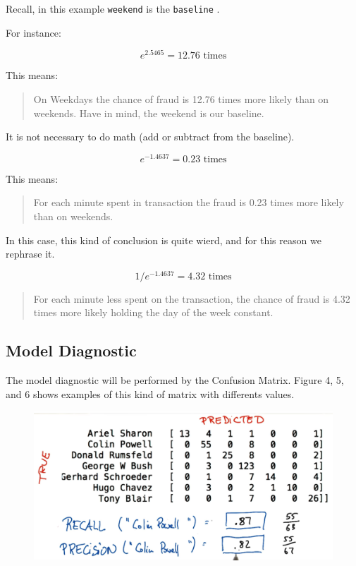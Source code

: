 \documentclass[]{book}
\begin{document}
Recall, in this example \texttt{weekend} is the \texttt{baseline} .

For instance:

\[e^{2.5465} = 12.76 \text{ times} \]

This means:

\begin{quote}
On Weekdays the chance of fraud is 12.76 times more likely than on
weekends. Have in mind, the weekend is our baseline.
\end{quote}

It is not necessary to do math (add or subtract from the baseline).

\[e^{-1.4637} = 0.23 \text{ times} \]

This means:

\begin{quote}
For each minute spent in transaction the fraud is 0.23 times more likely
than on weekends.
\end{quote}

In this case, this kind of conclusion is quite wierd, and for this
reason we rephrase it.

\[1/e^{-1.4637} = 4.32 \text{ times} \]

\begin{quote}
For each minute less spent on the transaction, the chance of fraud is
4.32 times more likely holding the day of the week constant.
\end{quote}

\subsection{Model Diagnostic}\label{model-diagnostic}

The model diagnostic will be performed by the Confusion Matrix. Figure
4, 5, and 6 shows examples of this kind of matrix with differents
values.

\begin{figure}
\centering
\includegraphics{01-img/c4_l16_04.png}
\caption{}
\end{figure}
\end{document}
